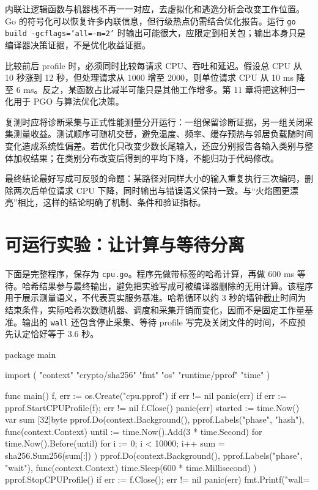 \documentclass[UTF8,fontset=fandol,openany,11pt]{ctexbook}
\begin{document}
内联让逻辑函数与机器栈不再一一对应，去虚拟化和逃逸分析会改变工作位置。Go 的符号化可以恢复许多内联信息，但行级热点仍需结合优化报告。运行 \texttt{go build -\allowbreak{}gcflags='all=-\allowbreak{}m=2'} 时输出可能很大，应限定到相关包；输出本身只是编译器决策证据，不是优化收益证据。

比较前后 profile 时，必须同时比较每请求 CPU、吞吐和延迟。假设总 CPU 从 10 秒涨到 12 秒，但处理请求从 1000 增至 2000，则单位请求 CPU 从 10 ms 降至 6 ms。反之，某函数占比减半可能只是其他工作增多。第 11 章将把这种归一化用于 PGO 与算法优化决策。

复测时应将诊断采集与正式性能测量分开运行：一组保留诊断证据，另一组关闭采集测量收益。测试顺序可随机交替，避免温度、频率、缓存预热与邻居负载随时间变化造成系统性偏差。若优化只改变少数长尾输入，还应分别报告各输入类别与整体加权结果；在类别分布改变后得到的平均下降，不能归功于代码修改。

最终结论最好写成可反驳的命题：某路径对同样大小的输入重复执行三次编码，删除两次后单位请求 CPU 下降，同时输出与错误语义保持一致。与“火焰图更漂亮”相比，这样的结论明确了机制、条件和验证指标。

\section{可运行实验：让计算与等待分离}
下面是完整程序，保存为 \texttt{cpu.\allowbreak{}go}。程序先做带标签的哈希计算，再做 600 ms 等待。哈希结果参与最终输出，避免把实验写成可被编译器删除的无用计算。该程序用于展示测量语义，不代表真实服务基准。哈希循环以约 3 秒的墙钟截止时间为结束条件，实际哈希次数随机器、调度和采集开销而变化，因而不是固定工作量基准。输出的 \texttt{wall} 还包含停止采集、等待 profile 写完及关闭文件的时间，不应预先认定恰好等于 3.6 秒。

\begin{codeblock}
package main

import (
	"context"
	"crypto/sha256"
	"fmt"
	"os"
	"runtime/pprof"
	"time"
)

func main() {
	f, err := os.Create("cpu.pprof")
	if err != nil {
		panic(err)
	}
	if err := pprof.StartCPUProfile(f); err != nil {
		f.Close()
		panic(err)
	}
	started := time.Now()
	var sum [32]byte
	pprof.Do(context.Background(), pprof.Labels("phase", "hash"),
		func(context.Context) {
			until := time.Now().Add(3 * time.Second)
			for time.Now().Before(until) {
				for i := 0; i < 10000; i++ {
					sum = sha256.Sum256(sum[:])
				}
			}
		})
	pprof.Do(context.Background(), pprof.Labels("phase", "wait"),
		func(context.Context) { time.Sleep(600 * time.Millisecond) })
	pprof.StopCPUProfile()
	if err := f.Close(); err != nil {
		panic(err)
	}
	fmt.Printf("wall=%
}
\end{codeblock}
\end{document}
